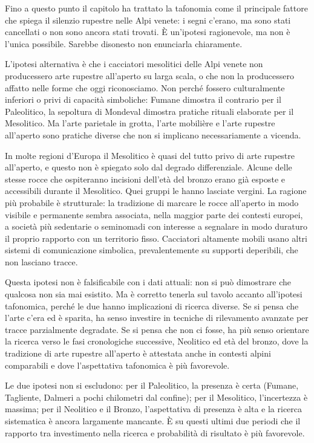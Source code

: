 Fino a questo punto il capitolo ha trattato la tafonomia come il principale fattore che spiega il silenzio rupestre nelle Alpi venete: i segni c'erano, ma sono stati cancellati o non sono ancora stati trovati. È un'ipotesi ragionevole, ma non è l'unica possibile. Sarebbe disonesto non enunciarla chiaramente.

L'ipotesi alternativa è che i cacciatori mesolitici delle Alpi venete non producessero arte rupestre all'aperto su larga scala, o che non la producessero affatto nelle forme che oggi riconosciamo. Non perché fossero culturalmente inferiori o privi di capacità simboliche: Fumane dimostra il contrario per il Paleolitico, la sepoltura di Mondeval dimostra pratiche rituali elaborate per il Mesolitico. Ma l'arte parietale in grotta, l'arte mobilière e l'arte rupestre all'aperto sono pratiche diverse che non si implicano necessariamente a vicenda.

In molte regioni d'Europa il Mesolitico è quasi del tutto privo di arte rupestre all'aperto, e questo non è spiegato solo dal degrado differenziale. Alcune delle stesse rocce che ospiteranno incisioni dell'età del bronzo erano già esposte e accessibili durante il Mesolitico. Quei gruppi le hanno lasciate vergini. La ragione più probabile è strutturale: la tradizione di marcare le rocce all'aperto in modo visibile e permanente sembra associata, nella maggior parte dei contesti europei, a società più sedentarie o seminomadi con interesse a segnalare in modo duraturo il proprio rapporto con un territorio fisso. Cacciatori altamente mobili usano altri sistemi di comunicazione simbolica, prevalentemente su supporti deperibili, che non lasciano tracce.

Questa ipotesi non è falsificabile con i dati attuali: non si può dimostrare che qualcosa non sia mai esistito. Ma è corretto tenerla sul tavolo accanto all'ipotesi tafonomica, perché le due hanno implicazioni di ricerca diverse. Se si pensa che l'arte c'era ed è sparita, ha senso investire in tecniche di rilevamento avanzate per tracce parzialmente degradate. Se si pensa che non ci fosse, ha più senso orientare la ricerca verso le fasi cronologiche successive, Neolitico ed età del bronzo, dove la tradizione di arte rupestre all'aperto è attestata anche in contesti alpini comparabili e dove l'aspettativa tafonomica è più favorevole.

Le due ipotesi non si escludono: per il Paleolitico, la presenza è certa (Fumane, Tagliente, Dalmeri a pochi chilometri dal confine); per il Mesolitico, l'incertezza è massima; per il Neolitico e il Bronzo, l'aspettativa di presenza è alta e la ricerca sistematica è ancora largamente mancante. È su questi ultimi due periodi che il rapporto tra investimento nella ricerca e probabilità di risultato è più favorevole.
